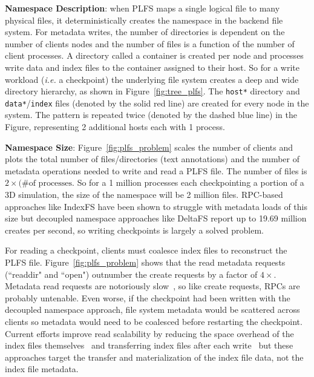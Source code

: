 

\textbf{Namespace Description}: when PLFS maps a single logical file to many
physical files, it deterministically creates the namespace in the backend file
system.  For metadata writes, the number of directories is dependent on the
number of clients nodes and the number of files is a function of the number of
client processes.  A directory called a container is created per node and
processes write data and index files to the container assigned to their host.
So for a write workload ({\it i.e.} a checkpoint) the underlying file system
creates a deep and wide directory hierarchy, as shown in
Figure~\ref{fig:tree_plfs}.  The \texttt{host*} directory and
\texttt{data*}/\texttt{index} files (denoted by the solid red line) are created
for every node in the system. The pattern is repeated twice (denoted by the
dashed blue line) in the Figure, representing 2 additional hosts each with 1
process.

\textbf{Namespace Size}: Figure~\ref{fig:plfs_problem} scales the number of
clients and plots the total number of files/directories (text annotations) and
the number of metadata operations needed to write and read a PLFS file.  The
number of files is \(2\times(\text{\# of processes}\).  So for a 1 million processes
each checkpointing a portion of a 3D simulation, the size of the namespace will
be 2 million files.  RPC-based approaches like IndexFS have been shown to
struggle with metadata loads of this size but decoupled namespace approaches
like DeltaFS report up to 19.69 million creates per second, so writing
checkpoints is largely a solved problem.

For reading a checkpoint, clients must coalesce index files to reconstruct the
PLFS file. Figure~\ref{fig:plfs_problem} shows that the read metadata requests
(``readdir" and ``open") outnumber the create requests by a factor of
\(4\times\). Metadata read requests are notoriously
slow~\cite{carns:ipdps09-pvfs, eshel:fast10-panache}, so like create requests,
RPCs are probably untenable. Even worse, if the checkpoint had been written
with the decoupled namespace approach, file system metadata would be scattered
across clients so metadata would need to be coalesced before restarting the
checkpoint.  Current efforts improve read scalability by reducing the space
overhead of the index files themselves~\cite{he:hpdc13-plfs-patterns} and
transferring index files after each write~\cite{grider:pc17-diddlings} but
these approaches target the transfer and materialization of the index file
data, not the index file metadata.


